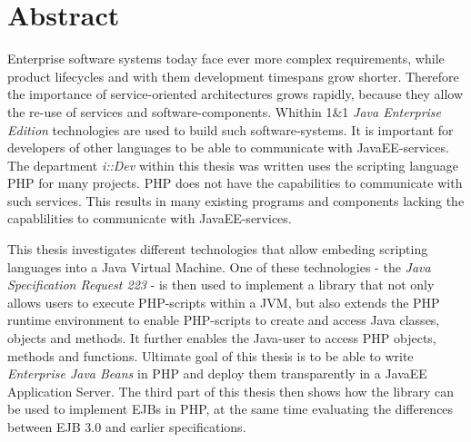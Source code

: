 \chapter{Abstract}

Enterprise software systems today face ever more complex requirements, while product
lifecycles and with them development timespans grow shorter. Therefore the importance of
service-oriented architectures grows rapidly, because they allow the re-use of services and
software-components. Whithin 1\&1 \emph{Java Enterprise Edition} technologies are used to
build such software-systems. It is important for developers of other languages to be able
to communicate with JavaEE-services. The department \emph{i::Dev} within this thesis was
written uses the scripting language PHP for many projects. PHP does not have the capabilities
to communicate with such services. This results in many existing programs and components lacking
the capablilities to communicate with JavaEE-services. 

This thesis investigates different technologies that allow embeding scripting languages into
a Java Virtual Machine. One of these technologies - the \emph{Java Specification Request 223} - 
is then used to implement a library that not only allows users to execute PHP-scripts within a
JVM, but also extends the PHP runtime environment to enable PHP-scripts to create and access Java classes, 
objects and methods. It further enables the Java-user to access PHP objects, methods and functions.
Ultimate goal of this thesis is to be able to write \emph{Enterprise Java Beans} in PHP and deploy
them transparently in a JavaEE Application Server.
The third part of this thesis then shows how the library can be used to implement EJBs in PHP, at
the same time evaluating the differences between EJB 3.0 and earlier specifications.

\cleardoublepage

\pagestyle{headings}
\tableofcontents

